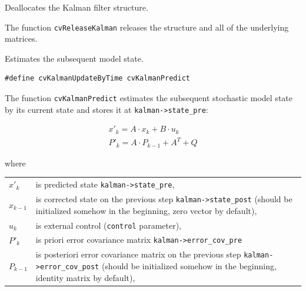 \label{ReleaseKalman}

Deallocates the Kalman filter structure.


\begin{description}
\end{description}

The function \texttt{cvReleaseKalman} releases the structure  and all of the underlying matrices.

\label{KalmanPredict}

Estimates the subsequent model state.

\begin{lstlisting}
#define cvKalmanUpdateByTime cvKalmanPredict
\end{lstlisting}

\begin{description}
\end{description}

The function \texttt{cvKalmanPredict} estimates the subsequent stochastic model state by its current state and stores it at \texttt{kalman->state\_pre}:

\[
\begin{array}{l}
x'_k=A \cdot x_k+B \cdot u_k\\
P'_k=A \cdot P_{k-1}+A^T + Q
\end{array}
\]

where

\begin{tabular}{l p{5 in}}
$x'_k$ & is predicted state \texttt{kalman->state\_pre},\\
$x_{k-1}$ & is corrected state on the previous step \texttt{kalman->state\_post}
                (should be initialized somehow in the beginning, zero vector by default),\\
$u_k$ & is external control (\texttt{control} parameter),\\
$P'_k$ & is priori error covariance matrix \texttt{kalman->error\_cov\_pre}\\
$P_{k-1}$ & is posteriori error covariance matrix on the previous step \texttt{kalman->error\_cov\_post}
                (should be initialized somehow in the beginning, identity matrix by default),
\end{tabular}


